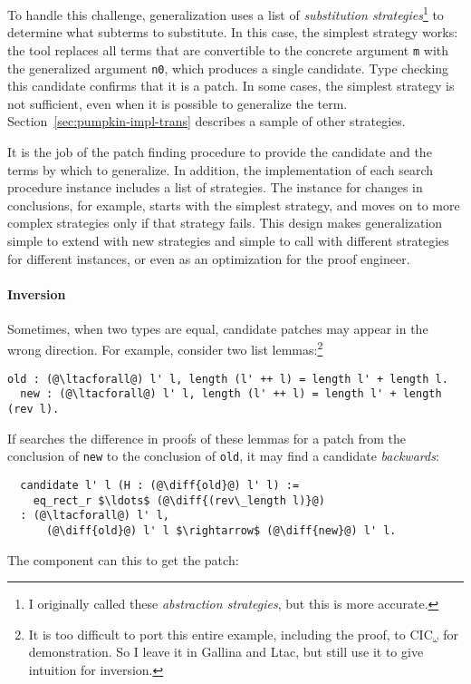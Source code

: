 To handle this challenge, generalization uses a list of \textit{substitution strategies}\footnote{I originally called these \textit{abstraction strategies}, but this is more accurate.}
to determine what subterms to substitute.
In this case, the simplest strategy works: the tool
replaces all terms that are convertible to the concrete argument \lstinline{m} with the generalized argument
\lstinline{n0}, which produces a single candidate. Type checking this candidate confirms that it is a patch.
In some cases, the simplest strategy is not sufficient, even when it is possible to generalize the term.
Section~\ref{sec:pumpkin-impl-trans} describes a sample of other strategies.

It is the job of the patch finding procedure to provide the candidate and the terms by which to generalize.
In addition, the implementation of each search procedure instance includes a list of strategies.
The instance for changes in conclusions, for example, starts with the simplest strategy,
and moves on to more complex strategies only if that strategy fails.
This design makes generalization simple to extend with new strategies and simple to call with different strategies
for different instances, or even as an optimization for the proof engineer.

\paragraph{Inversion} Sometimes, when two types are  equal,
candidate patches may appear in the wrong direction.
For example, consider two list lemmas:\footnote{It is too difficult to port this entire example, including the proof, to CIC$_{\omega}$ for demonstration.
So I leave it in Gallina and Ltac, but still use it to give intuition for inversion.}

\begin{lstlisting}[language=coq]
  old : (@\ltacforall@) l' l, length (l' ++ l) = length l' + length l.
  new : (@\ltacforall@) l' l, length (l' ++ l) = length l' + length (rev l).
\end{lstlisting} 
If \sysname searches the difference in proofs of these lemmas for a patch from the 
conclusion of \lstinline{new} to the conclusion of \lstinline{old},
it may find a candidate \emph{backwards}:

\begin{lstlisting}
  candidate l' l (H : (@\diff{old}@) l' l) :=
    eq_rect_r $\ldots$ (@\diff{(rev\_length l)}@)
  : (@\ltacforall@) l' l,
      (@\diff{old}@) l' l $\rightarrow$ (@\diff{new}@) l' l.
\end{lstlisting}
The component can  this to get the patch: %

